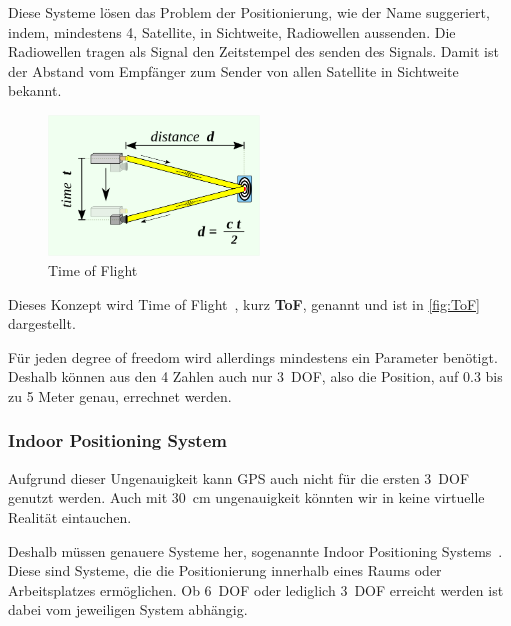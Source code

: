         Diese Systeme lösen das Problem der Positionierung, wie der Name suggeriert, indem, mindestens 4, Satellite, in Sichtweite, Radiowellen aussenden.
        Die Radiowellen tragen als Signal den Zeitstempel des senden des Signals.
        Damit ist der Abstand vom Empfänger zum Sender von allen Satellite in Sichtweite bekannt.

        \begin{figure}[ht!]
            \center
            \includegraphics[width={0.5\textwidth}]{../assets/img/time_of_flight}
            \caption{Time of Flight~\autocite{wikipedia-contributors-2023D}}
            \label{fig:ToF}
        \end{figure}

        Dieses Konzept wird Time of Flight~\autocite{wikipedia-contributors-2023D}, kurz \textbf{ToF}, genannt und ist in \autoref{fig:ToF} dargestellt.

        Für jeden degree of freedom wird allerdings mindestens ein Parameter benötigt.
        Deshalb können aus den 4 Zahlen auch nur 3~DOF, also die Position, auf 0.3 bis zu 5 Meter genau, errechnet werden.

    \subsubsection{Indoor Positioning System}\label{subsubsec:indoor-positioning-system}
        Aufgrund dieser Ungenauigkeit kann GPS auch nicht für die ersten 3~DOF genutzt werden.
        Auch mit 30~cm ungenauigkeit könnten wir in keine virtuelle Realität eintauchen.

        Deshalb müssen genauere Systeme her, sogenannte Indoor Positioning Systems~\autocite{wikipedia-contributors-2023E}.
        Diese sind Systeme, die die Positionierung innerhalb eines Raums oder Arbeitsplatzes ermöglichen.
        Ob 6~DOF oder lediglich 3~DOF erreicht werden ist dabei vom jeweiligen System abhängig.

